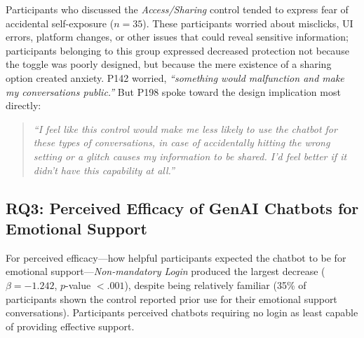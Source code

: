 \documentclass[letterpaper,twocolumn,10pt]{article}
\begin{document}
 Participants who discussed the \emph{Access/Sharing} control tended to express fear of accidental self-exposure ($n=35$). These participants worried about misclicks, UI errors, platform changes, or other issues that could reveal sensitive information; participants belonging to this group expressed decreased protection not because the toggle was poorly designed, but because the mere existence of a sharing option created anxiety. P142 worried, \textit{``something would malfunction and make my conversations public.''} But P198 spoke toward the design implication most directly:

\begin{quote}
\textit{``I feel like this control would make me less likely to use the chatbot for these types of conversations, in case of accidentally hitting the wrong setting or a glitch causes my information to be shared. I'd feel better if it didn't have this capability at all.''}
\end{quote}

\subsection{RQ3: Perceived Efficacy of GenAI Chatbots for Emotional Support} \label{sec:rq3-efficacy}  

 For perceived efficacy---how helpful participants expected the chatbot to be for emotional support---\emph{Non-mandatory Login} produced the largest decrease ($\beta = -1.242$, $p$-value $< .001$), despite being relatively familiar (35\% of participants shown the control reported prior use for their emotional support conversations). Participants perceived chatbots requiring no login as least capable of providing effective support.
\end{document}
